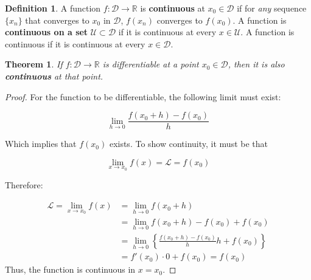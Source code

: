 \documentclass[a4paper,11pt]{article}
\theoremstyle{definition}
\newtheorem{definition}{Definition}
\theoremstyle{plain}
\newtheorem{theorem}{Theorem}
\begin{document}
\begin{definition}
A function \(f:\mathcal{D}\rightarrow\mathbb{R}\)
is \textbf{continuous} at \(x_0\in\mathcal{D}\) if for \emph{any}
sequence \(\{x_n\}\) that converges to \(x_0\) in \(\mathcal{D}\),
\(f(x_n)\) converges to \(f(x_0)\). A function is \textbf{continuous on
a set} \(\mathcal{U}\subset\mathcal{D}\) if it is continuous at every
\(x\in\mathcal{U}\). A function is continuous if it is continuous at
every \(x\in\mathcal{D}\).
\end{definition}

\begin{theorem}
If \(f : \mathcal{D}\rightarrow\mathbb{R}\) is
differentiable at a point \(x_0\in\mathcal{D}\), then it is also
\textbf{continuous} at that point.
\end{theorem}

\begin{proof}
For the function to be differentiable, the following
limit must exist:

\[
\lim_{h\rightarrow 0}\frac{f(x_0 + h) - f(x_0)}{h}
\]

Which implies that \(f(x_0)\) exists. To show continuity, it must be
that

\[
\lim_{x\rightarrow x_0}f(x) = \mathcal{L} = f(x_0)
\]

Therefore:

\begin{align*}
\mathcal{L} = \lim_{x\rightarrow x_0}f(x) & = \lim_{h\rightarrow 0}f(x_0 + h) \\
& = \lim_{h\rightarrow 0}f(x_0 + h)-f(x_0) + f(x_0) \\
& = \lim_{h\rightarrow 0}\left\{\frac{f(x_0+h)-f(x_0)}{h}h + f(x_0)\right\} \\
& = f'(x_0) \cdot 0 + f(x_0) = f(x_0)
\end{align*}
Thus, the function is continuous in \(x = x_0\).
\end{proof}
\end{document}

